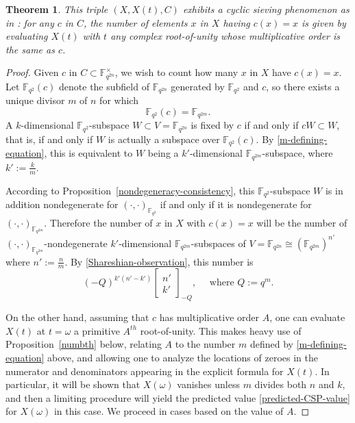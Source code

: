 \documentclass[10pt]{amsart}
\theoremstyle{plain}
\newtheorem{theorem}{Theorem}
\theoremstyle{definition}
\theoremstyle{remark}
\numberwithin{equation}{section}
\newcommand\qbin[3]{\left[\begin{matrix} #1 \\ #2 \end{matrix} \right]_{#3}}
\newcommand\FF{\mathbb{F}}
\begin{document}
\begin{theorem}
\label{CSP-theorem}
This triple $(X,X(t),C)$ exhibits a {\sf cyclic sieving phenomenon}
as in \cite{RSW}:  for any $c$ in $C$,  
the number of elements $x$ in $X$ having $c(x)=x$ is given by
evaluating $X(t)$ with $t$ any complex root-of-unity whose
multiplicative order is the same as $c$.
\end{theorem}
\begin{proof}
Given $c$ in $C\subset \FF_{q^{2n}}^\times$, we wish to count how many
$x$ in $X$ have $c(x)=x$.  Let $\FF_{q^2}(c)$ denote the subfield of
$\FF_{q^{2n}}$ generated by $\FF_{q^2}$ and $c$, so there exists
a unique divisor $m$ of $n$ for which 
\begin{equation}
\label{m-defining-equation}
\FF_{q^2}(c)=\FF_{q^{2m}}.
\end{equation}
A $k$-dimensional $\FF_{q^2}$-subspace 
$W \subset V=\FF_{q^{2n}}$ is fixed by $c$ if and only if $cW \subset W$, that is,
if and only if $W$ is actually a subspace over $\FF_{q^2}(c)$.
By \eqref{m-defining-equation}, this is equivalent to $W$ being
a $k'$-dimensional $\FF_{q^{2m}}$-subspace, where $k':=\frac{k}{m}$.

According to Proposition~\ref{nondegeneracy-consistency},
this $\FF_{q^2}$-subspace $W$ is in addition nondegenerate for 
$(\cdot,\cdot)_{\FF_{q^2}}$ if and only if it is nondegenerate for
$(\cdot,\cdot)_{\FF_{q^{2m}}}$.
Therefore the number of $x$ in $X$ with $c(x)=x$ will be the number of
 $(\cdot,\cdot)_{\FF_{q^{2m}}}$-nondegenerate $k'$-dimensional
$\FF_{q^{2m}}$-subspaces of $V=\FF_{q^{2n}} \cong (\FF_{q^{2m}})^{n'}$
where $n':=\frac{n}{m}$.  By \eqref{Shareshian-observation}, this number is 
\begin{equation}
\label{predicted-CSP-value}
(-Q)^{k'(n'-k')}
\qbin{n'}{k'}{-Q}, \quad \text{ where }Q:=q^m.
\end{equation}

On the other hand, assuming that $c$ has multiplicative order $A$, one
can evaluate $X(t)$ at $t=\omega$ a primitive $A^{th}$ root-of-unity. This 
makes heavy use of Proposition~\ref{numbth} below, relating $A$
to the number $m$ defined by  \eqref{m-defining-equation} above, and
allowing one to analyze the locations of zeroes in the
numerator and denominators appearing in the explicit formula for 
$X(t)$.  In particular, it will be shown that
$X(\omega)$ vanishes unless $m$ divides both $n$ and $k$,
and then a limiting procedure will yield the predicted 
value \eqref{predicted-CSP-value} for $X(\omega)$ in this case.  
We proceed in cases based on the value of $A$.


\end{proof}
\end{document}
